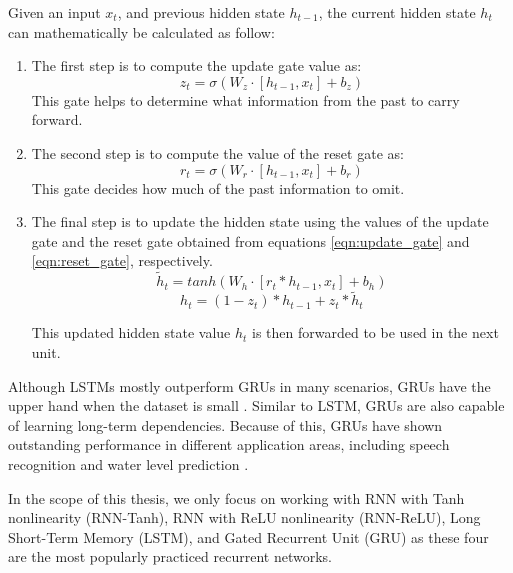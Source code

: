 Given an input $x_t$, and previous hidden state $h_{t-1}$, the current hidden state $h_t$ can mathematically be calculated as follow:

\begin{enumerate}
    \item The first step is to compute the update gate value as:
        \begin{equation}
            \label{eqn:update_gate}
            z_t = \sigma(W_z \cdot [h_{t-1}, x_t] + b_z)
        \end{equation}
        This gate helps to determine what information from the past to carry forward.
        
    \item The second step is to compute the value of the reset gate as:
        \begin{equation}
            \label{eqn:reset_gate}
            r_t = \sigma(W_r \cdot [h_{t-1}, x_t] + b_r)
        \end{equation}
        This gate decides how much of the past information to omit.
        
    \item The final step is to update the hidden state using the values of the update gate and the reset gate obtained        from equations \ref{eqn:update_gate} and \ref{eqn:reset_gate}, respectively.
        \begin{equation}
            \widetilde{h}_t = tanh(W_h \cdot [r_t * h_{t-1}, x_t] + b_h)
        \end{equation}
        \begin{equation}
            \label{eqn:update_hidden}
            h_t = (1 - z_t) * h_{t-1} + z_t * \widetilde{h}_t
        \end{equation}
        
    This updated hidden state value $h_t$ is then forwarded to be used in the next unit.
\end{enumerate}

Although LSTMs mostly outperform GRUs in many scenarios, GRUs have the upper hand when the dataset is small \cite{gru_lstm}. Similar to LSTM, GRUs are also capable of learning long-term dependencies. Because of this, GRUs have shown outstanding performance in different application areas, including speech recognition \cite{gru_speech} and water level prediction \cite{gru_water_level}.

In the scope of this thesis, we only focus on working with RNN with Tanh nonlinearity (RNN-Tanh), RNN with ReLU nonlinearity (RNN-ReLU), Long Short-Term Memory (LSTM), and Gated Recurrent Unit (GRU) as these four are the most popularly practiced recurrent networks.

